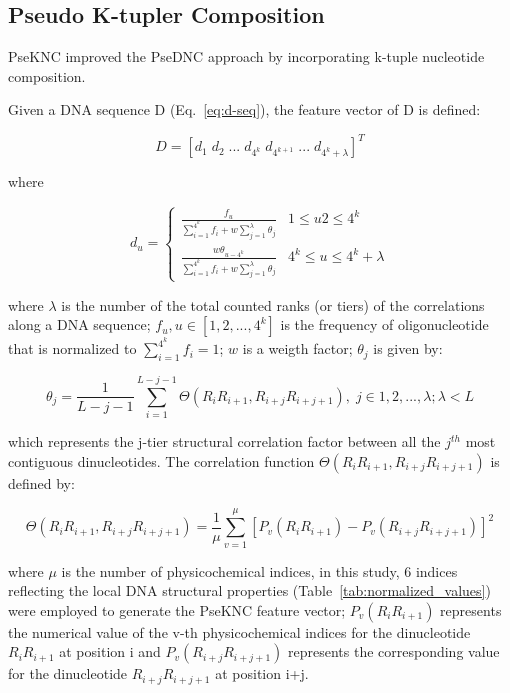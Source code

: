 \subsection{Pseudo K-tupler Composition}


\gls{PseKNC} improved the \gls{PseDNC} approach by incorporating k-tuple nucleotide composition.

Given a DNA sequence D (Eq.~\ref{eq:d-seq}), the feature vector of D is defined:

\begin{equation}\label{eq:PseKNC-feature-vector}
    D = [d_{1}\;d_{2}\;...\;d_{4^{k}}\;d_{4^{k+1}}\;...\;d_{4^{k} + \lambda}]^{T}
\end{equation}

where

\begin{equation}\label{eq:PseKNC-du}
    d_{u} = 
    \begin{cases}
        \frac{f_{u}}{\sum_{i=1}^{4^{k}} f_{i} + w\sum_{j=1}^{\lambda}\theta_{j}} & 1 \le u2 \le 4^{k}
    \\
        \frac{w\theta_{u-4^{k}}}{\sum_{i=1}^{4^{k}} f_{i} + w\sum_{j=1}^{\lambda}\theta_{j}} & 4^{k} \le u \le 4^{k} + \lambda
    
    \end{cases}
\end{equation}

where $\lambda$ is the number of the total counted ranks (or tiers) of the correlations along a DNA sequence; $f_{u}, u\in[1,2,...,4^{k}]$ is the frequency of oligonucleotide that is normalized to $\sum_{i=1}^{4^{k}}f_{i} = 1$; $w$ is a weigth factor; $\theta_{j}$ is given by:

\begin{equation}\label{eq:PseKNC-thetas}
\theta_{j} = \frac{1}{L-j-1} \sum_{i=1}^{L-j-1}\Theta(R_{i}R_{i+1}, R_{i+j}R_{i+j+1}), \;j\in{1,2,...,\lambda;\lambda < L}
\end{equation}

which represents the j-tier structural correlation factor between all the $j^{th}$ most
contiguous dinucleotides. The correlation function $\Theta(R_{i}R_{i+1}, R_{i+j}R_{i+j+1})$ is defined by:

\begin{equation}\label{eq:PseKNC-correlation}
    \Theta(R_{i}R_{i+1}, R_{i+j}R_{i+j+1}) = \frac{1}{\mu}\sum_{v=1}^{\mu}[P_{v} (R_{i}R_{i+1}) - P_{v}(R_{i+j}R_{i+j+1})]^{2}
\end{equation}

where $\mu$ is the number of physicochemical indices, in this study, 6 indices reflecting the local DNA structural properties (Table~\ref{tab:normalized_values}) were employed to generate the \gls{PseKNC} feature vector; $P_{v} (R_{i}R_{i+1})$ represents the numerical value of the v-th physicochemical indices for the dinucleotide $R_{i}R_{i+1}$ at position i and $P_{v} (R_{i+j}R_{i+j+1})$ represents the corresponding value for the dinucleotide $R_{i+j}R_{i+j+1}$ at position i+j.
